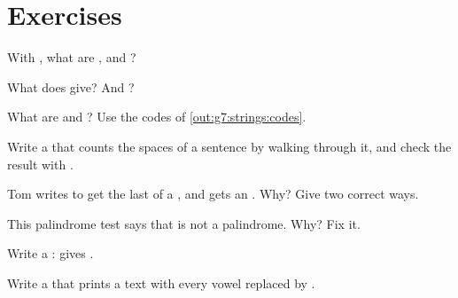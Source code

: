 \section{Exercises}

\begin{exercise}[$\star$]\label{exo:g7:strings:1}
With , what are ,  and
?
\end{exercise}

\begin{exercise}[$\star$]\label{exo:g7:strings:2}
What does  give? And
?
\end{exercise}

\begin{exercise}[$\star$]\label{exo:g7:strings:3}
What are  and ? Use the codes of
\cref{out:g7:strings:codes}.
\end{exercise}

\begin{exercise}[$\star$]\label{exo:g7:strings:4}
Write a  that counts the spaces of a sentence by walking through it,
and check the result with .
\end{exercise}

\begin{exercise}[$\star\star$]\label{exo:g7:strings:5}
Tom writes  to get the last  of a , and gets an
. Why? Give two correct ways.
\end{exercise}

\begin{exercise}[$\star\star$]\label{exo:g7:strings:6}
This palindrome test says that  is not a palindrome. Why? Fix it.

\label{lst:g7:strings:palindrome-bug}
\end{exercise}

\begin{exercise}[$\star\star$]\label{exo:g7:strings:7}
Write a  :  gives
.
\end{exercise}

\begin{exercise}[$\star\star$]\label{exo:g7:strings:8}
Write a  that prints a text with every vowel replaced by \code{*}.
\end{exercise}

